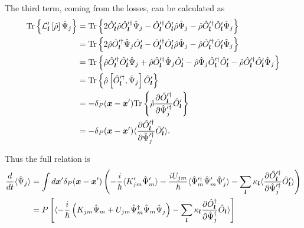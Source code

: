 The third term, coming from the losses, can be calculated as
\begin{equation*}
\begin{split}
	\mathrm{Tr} \left\{ 
		\mathcal{L}_{\boldsymbol{l}}^\prime \left[ \hat{\rho} \right]
		\hat{\Psi}_j
	 \right\}
	& = \mathrm{Tr} \left\{ 
		2 \hat{O}_{\boldsymbol{l}}^\prime \hat{\rho} \hat{O}_{\boldsymbol{l}}^{\prime\dagger} \hat{\Psi}_j
		- \hat{O}_{\boldsymbol{l}}^{\prime\dagger} \hat{O}_{\boldsymbol{l}}^\prime \hat{\rho} \hat{\Psi}_j
		- \hat{\rho} \hat{O}_{\boldsymbol{l}}^{\prime\dagger} \hat{O}_{\boldsymbol{l}}^\prime \hat{\Psi}_j
	 \right\} \\
	& = \mathrm{Tr} \left\{ 
		2 \hat{\rho} \hat{O}_{\boldsymbol{l}}^{\prime\dagger} \hat{\Psi}_j \hat{O}_{\boldsymbol{l}}^\prime
		- \hat{O}_{\boldsymbol{l}}^{\prime\dagger} \hat{O}_{\boldsymbol{l}}^\prime \hat{\rho} \hat{\Psi}_j
		- \hat{\rho} \hat{O}_{\boldsymbol{l}}^{\prime\dagger} \hat{O}_{\boldsymbol{l}}^\prime \hat{\Psi}_j
	 \right\} \\
	& = \mathrm{Tr} \left\{ 
		\hat{\rho} \hat{O}_{\boldsymbol{l}}^{\prime\dagger} \hat{O}_{\boldsymbol{l}}^\prime \hat{\Psi}_j
		+ \hat{\rho} \hat{O}_{\boldsymbol{l}}^{\prime\dagger} \hat{\Psi}_j \hat{O}_{\boldsymbol{l}}^\prime
		- \hat{\rho} \hat{\Psi}_j \hat{O}_{\boldsymbol{l}}^{\prime\dagger} \hat{O}_{\boldsymbol{l}}^\prime
		- \hat{\rho} \hat{O}_{\boldsymbol{l}}^{\prime\dagger} \hat{O}_{\boldsymbol{l}}^\prime \hat{\Psi}_j
	 \right\} \\
	& = \mathrm{Tr} \left\{ 
		\hat{\rho} \left[
			\hat{O}_{\boldsymbol{l}}^{\prime\dagger}, \hat{\Psi}_j
		\right] \hat{O}_{\boldsymbol{l}}^\prime
	 \right\} \\
	& = -\delta_P(\boldsymbol{x} - \boldsymbol{x}^\prime)	\mathrm{Tr} \left\{ 
		\hat{\rho} \frac{\partial \hat{O}_{\boldsymbol{l}}^{\prime\dagger}}{\partial \hat{\Psi}_j^{\prime\dagger}}
		\hat{O}_{\boldsymbol{l}}^\prime
	 \right\} \\
	& = -\delta_P(\boldsymbol{x} - \boldsymbol{x}^\prime) \langle
		\frac{\partial \hat{O}_{\boldsymbol{l}}^{\prime\dagger}}{\partial \hat{\Psi}_j^{\prime\dagger}}
		\hat{O}_{\boldsymbol{l}}^\prime
	\rangle.
\end{split}
\end{equation*}

Thus the full relation is
\begin{equation*}
\begin{split}
	\frac{d}{dt} \langle \hat{\Psi}_j \rangle
	& = \int d\boldsymbol{x}^\prime \delta_P(\boldsymbol{x} - \boldsymbol{x}^\prime) \left(
		- \frac{i}{\hbar} \langle K_{jm}^\prime \hat{\Psi}_m^\prime \rangle
		- \frac{i U_{jm}}{\hbar} \langle
			\hat{\Psi}_m^{\prime\dagger} \hat{\Psi}_m^\prime \hat{\Psi}_j^\prime
		\rangle
		- \sum\limits_{\boldsymbol{l}} \kappa_{\boldsymbol{l}} \langle
			\frac{\partial \hat{O}_{\boldsymbol{l}}^{\prime\dagger}}{\partial \hat{\Psi}_j^{\prime\dagger}}
			\hat{O}_{\boldsymbol{l}}^\prime
		\rangle
	\right) \\
	& = P \left[
		\langle
			-\frac{i}{\hbar} \left(
				K_{jm} \hat{\Psi}_m
				+ U_{jm} \hat{\Psi}_m^\dagger \hat{\Psi}_m \hat{\Psi}_j
			\right)
			- \sum\limits_{\boldsymbol{l}} \kappa_{\boldsymbol{l}}
				\frac{\partial \hat{O}_{\boldsymbol{l}}^\dagger}{\partial \hat{\Psi}_j^\dagger} \hat{O}_{\boldsymbol{l}}
		\rangle
	\right]
\end{split}
\end{equation*}


